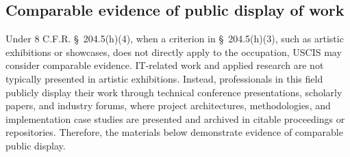 


\subsection{Comparable evidence of public display of work}

\label{subsec:Display}

Under 8 C.F.R. \S~204.5(h)(4), when a criterion in \S~204.5(h)(3), such as artistic exhibitions or showcases, does not directly apply to the occupation, USCIS may consider comparable evidence. IT-related work and applied research are not typically presented in artistic exhibitions. Instead, professionals in this field publicly display their work through technical conference presentations, scholarly papers, and industry forums, where project architectures, methodologies, and implementation case studies are presented and archived in citable proceedings or repositories. Therefore, the materials below demonstrate evidence of comparable public display.

\bigskip

